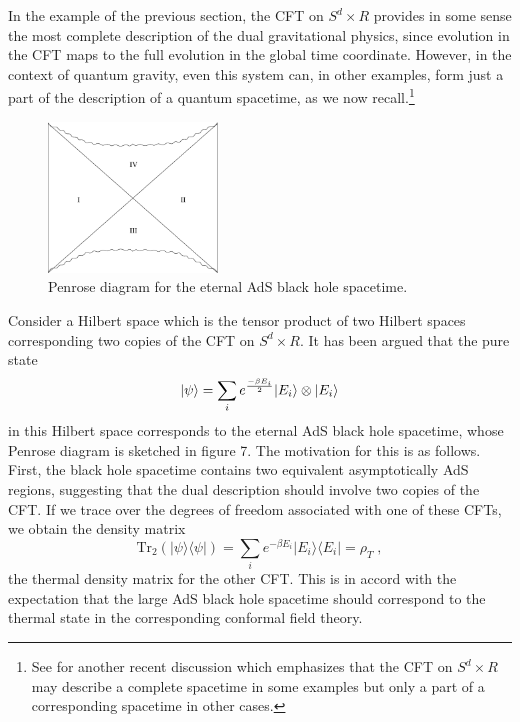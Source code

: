 \documentclass[12pt,epsf]{article}
\newcommand{\be}{\begin{equation}}
\newcommand{\ee}{\end{equation}}
\renewcommand{\(}{\left(}
\renewcommand{\)}{\right)}
\newcommand{\tr}{\mathrm{Tr}}
\begin{document}
In the example of the previous section, the CFT on $S^d \times R$ provides in some sense the most complete description of the dual gravitational physics, since evolution in the CFT maps to the full evolution in the global time coordinate. However, in the context of quantum gravity, even this system can, in other examples, form just a part of the description of a quantum spacetime, as we now recall.\footnote{See \cite{marolf} for another recent discussion which emphasizes that the CFT on $S^d \times R$ may describe a complete spacetime in some examples but only a part of a corresponding spacetime in other cases.}
\begin{figure}
\centering
\includegraphics[width=0.4\textwidth]{penrose.eps}
\caption{Penrose diagram for the eternal AdS black hole spacetime.}
\end{figure}
Consider a Hilbert space which is the tensor product of two Hilbert spaces corresponding two copies of the CFT on $S^d \times R$. It has been argued \cite{eads,hm,bklt} that the pure state
\be
\label{hhstate}
|\psi \rangle = \sum_i e^{- \beta E_i \over 2} | E_i \rangle \otimes | E_i \rangle
\ee
in this Hilbert space corresponds to the eternal AdS black hole spacetime, whose Penrose diagram is sketched in figure 7. The motivation for this is as follows. First, the black hole spacetime contains two equivalent asymptotically AdS regions, suggesting that the dual description should involve two copies of the CFT. If we trace over the degrees of freedom associated with one of these CFTs, we obtain the density matrix
\[
\tr_2(|\psi \rangle \langle \psi |) = \sum_i e^{- \beta E_i } | E_i \rangle \langle E_i | = \rho_T \; ,
\]
the thermal density matrix for the other CFT. This is in accord with the expectation that the large AdS black hole spacetime should correspond to the thermal state in the corresponding conformal field theory.
\end{document}
